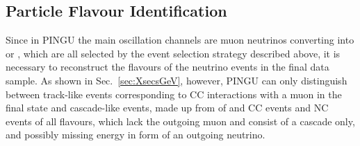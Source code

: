 \subsection{Particle Flavour Identification}
\label{sec:cuts_PID}

Since in PINGU the main oscillation channels are muon neutrinos converting into
\nue or \nutau, which are all selected by the event selection strategy
described above, it is necessary to reconstruct the flavours of the neutrino
events in the final data sample. As shown in Sec.~\ref{sec:XsecsGeV},
however, PINGU can only distinguish between track-like events corresponding to
\numu CC interactions with a muon in the final state and cascade-like events,
made up from of \nue and \nutau CC events and NC events of all flavours,
which lack the outgoing muon and consist of a cascade only, and possibly
missing energy in form of an outgoing neutrino.

